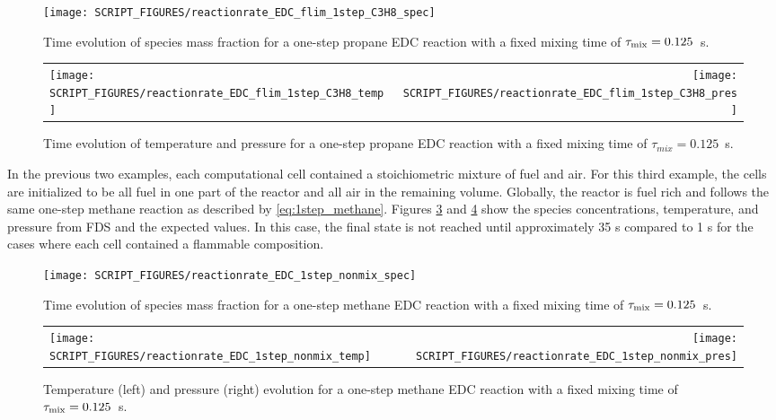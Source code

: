 \documentclass[11pt]{book}
\begin{document}
\begin{figure}[!ht]
\centering
\texttt{[image: SCRIPT\_FIGURES/reactionrate\_EDC\_flim\_1step\_C3H8\_spec]}
\caption[Species evolution in a 1-step propane EDC reaction]{Time evolution of species mass fraction for a one-step propane EDC reaction with a fixed mixing time of $\tau_{\rm mix}=0.125$~s.}
\label{fig:EDC_1Step_prop_spec}
\end{figure}

\begin{figure}[!ht]
\begin{tabular*}{\textwidth}{lr}
\texttt{[image: SCRIPT\_FIGURES/reactionrate\_EDC\_flim\_1step\_C3H8\_temp]} &
\texttt{[image: SCRIPT\_FIGURES/reactionrate\_EDC\_flim\_1step\_C3H8\_pres]}
\end{tabular*}
\caption[Temperature and pressure evolution in a 1-step propane EDC reaction]{Time evolution of temperature and pressure for a one-step propane EDC reaction with a fixed mixing time of $\tau_{mix}=0.125$~s.}
\label{fig:EDC_1Step_prop_temppres}
\end{figure}

In the previous two examples, each computational cell contained a stoichiometric mixture of fuel and air. For this third example, the cells are initialized to be all fuel in one part of the reactor and all air in the remaining volume. Globally, the reactor is fuel rich and follows the same one-step methane reaction as described by \ref{eq:1step_methane}. Figures \ref{fig:EDC_meth_non_spec} and \ref{fig:EDC_meth_non_temppres} show the species concentrations, temperature, and pressure from FDS and the expected values. In this case, the final state is not reached until approximately 35 s compared to 1 s for the cases where each cell contained a flammable composition.

\begin{figure}[!ht]
\centering
\texttt{[image: SCRIPT\_FIGURES/reactionrate\_EDC\_1step\_nonmix\_spec]}
\caption[Species evolution in 1-Step methane EDC reaction]{Time evolution of species mass fraction for a one-step methane EDC reaction with a fixed mixing time of $\tau_{\rm mix}=0.125$~s. }
\label{fig:EDC_meth_non_spec}
\end{figure}

\begin{figure}[!ht]
\begin{tabular*}{\textwidth}{lr}
\texttt{[image: SCRIPT\_FIGURES/reactionrate\_EDC\_1step\_nonmix\_temp]} &
\texttt{[image: SCRIPT\_FIGURES/reactionrate\_EDC\_1step\_nonmix\_pres]}
\end{tabular*}
\caption[Temperature and pressure evolution in a 1-step Methane EDC reaction]{Temperature (left) and pressure (right) evolution for a one-step methane EDC reaction with a fixed mixing time of $\tau_{\rm mix}=0.125$~s.}
\label{fig:EDC_meth_non_temppres}
\end{figure}
\end{document}
